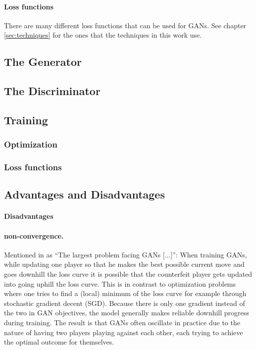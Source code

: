 \paragraph{Loss functions} There are many different loss functions that can be used for GANs. See chapter \ref{sec:techniques} for the ones that the techniques in this work use.

\subsection{The Generator}

\subsection{The Discriminator}

\subsection{Training}
\subsubsection{Optimization}
\subsubsection{Loss functions}


\subsection{Advantages and Disadvantages}
\paragraph{Disadvantages}
\paragraph{non-convergence.} Mentioned in \cite{DBLP:journals/corr/Goodfellow17} as ``The largest problem facing GANs [...]'': When training GANs, while updating one player so that he makes the best possible current move and goes downhill the loss curve it is possible that the counterfeit player gets updated into going uphill the loss curve. This is in contrast to optimization problems where one tries to find a (local) minimum of the loss curve for example through stochastic gradient decent (SGD). Because there is only one gradient instead of the two in GAN objectives, the model generally makes reliable downhill progress during training. The result is that GANs often oscillate in practice due to the nature of having two players playing against each other, each trying to achieve the optimal outcome for themselves. 

